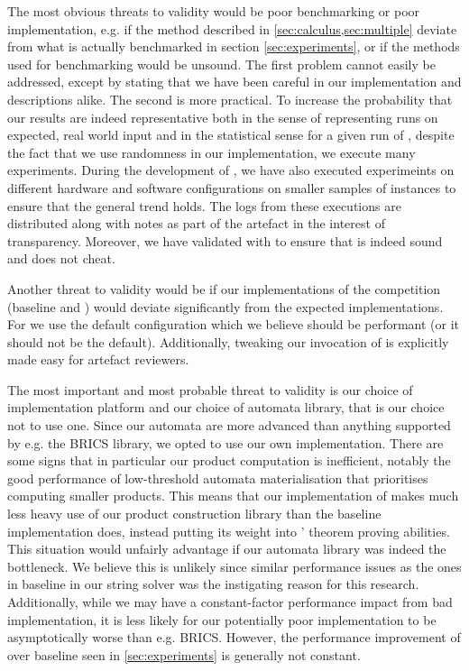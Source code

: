 \documentclass[acmsmall,review,anonymous,screen]{acmart}\settopmatter{printfolios=true,printccs=false,printacmref=true}
\theoremstyle{definition}
\begin{document}
The most obvious threats to validity would be poor benchmarking or poor
implementation, e.g. if the method described in \cref{sec:calculus,sec:multiple}
deviate from what is actually benchmarked in section \cref{sec:experiments}, or
if the methods used for benchmarking would be unsound. The first problem cannot
easily be addressed, except by stating that we have been careful in our
implementation and descriptions alike. The second is more practical. To increase
the probability that our results are indeed representative both in the sense of
representing runs on expected, real world input and in the statistical sense for
a given run of \Catra, despite the fact that we use randomness in our
implementation, we execute many experiments. During the development of \Catra{},
we have also executed experimeints on different hardware and software
configurations on smaller samples of instances to ensure that the general trend
holds. The logs from these executions are distributed along with notes as part
of the artefact in the interest of transparency. Moreover, we have validated
 with \Nuxmv{} to
ensure that \Calculus{} is indeed sound and does not cheat.

Another threat to validity would be if our implementations of the competition
(baseline and \Nuxmv) would deviate significantly from the expected
implementations. For \Nuxmv{} we use the default configuration which we believe
should be performant (or it should not be the default). Additionally, tweaking our invocation of \Nuxmv{} is explicitly made easy for artefact reviewers.

The most important and most probable threat to validity is our choice of
implementation platform and our choice of automata library, that is our choice
not to use one. Since our automata are more advanced than anything supported by
e.g. the BRICS library, we opted to use our own implementation. There are some
signs that in particular our product computation is inefficient, notably the
good performance of low-threshold automata materialisation that prioritises
computing smaller products. This means that our implementation of \Calculus{}
makes much less heavy use of our product construction library than the baseline
implementation does, instead putting its weight into \Princess{}' theorem
proving abilities. This situation would unfairly advantage \Calculus{} if our
automata library was indeed the bottleneck. We believe this is unlikely since
similar performance issues as the ones in baseline in our string solver was the
instigating reason for this research. Additionally, while we may have a
constant-factor performance impact from bad implementation, it is less likely
for our potentially poor implementation to be asymptotically worse than e.g.
BRICS. However, the performance improvement of \Calculus{} over baseline seen in
\cref{sec:experiments} is generally not constant.
\end{document}
